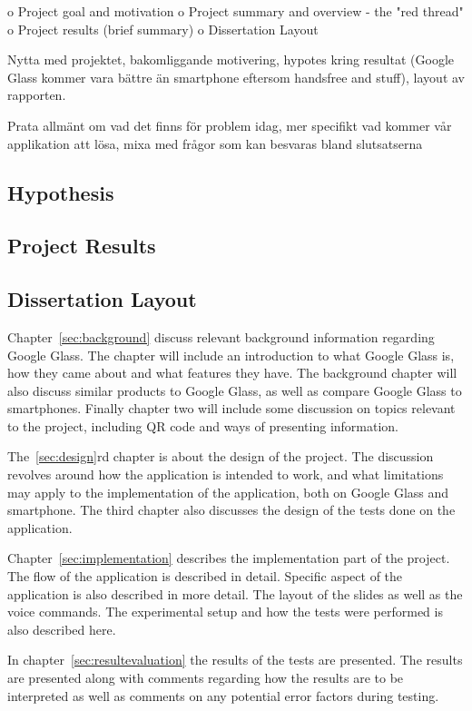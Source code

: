 o   Project goal and motivation
o   Project summary and overview - the "red thread"
o   Project results (brief summary)
o   Dissertation Layout

Nytta med projektet, bakomliggande motivering, hypotes kring resultat (Google Glass kommer vara bättre än smartphone eftersom handsfree and stuff), layout av rapporten.

Prata allmänt om vad det finns för problem idag, mer specifikt vad kommer vår applikation att lösa, mixa med frågor som kan besvaras bland slutsatserna

\subsection{Hypothesis}


\subsection{Project Results}


\subsection{Dissertation Layout}
Chapter~\ref{sec:background} discuss relevant background information regarding Google Glass. The chapter will include an introduction to what Google Glass is, how they came about and what features they have. The background chapter will also discuss similar products to Google Glass, as well as compare Google Glass to smartphones. Finally chapter two will include some discussion on topics relevant to the project, including QR code and ways of presenting information.

The~\ref{sec:design}rd chapter is about the design of the project. The discussion revolves around how the application is intended to work, and what limitations may apply to the implementation of the application, both on Google Glass and smartphone. The third chapter also discusses the design of the tests done on the application.

Chapter~\ref{sec:implementation} describes the implementation part of the project. The flow of the application is described in detail. Specific aspect of the application is also described in more detail. The layout of the slides as well as the voice commands. The experimental setup and how the tests were performed is also described here.

In chapter~\ref{sec:resultevaluation} the results of the tests are presented. The results are presented along with comments regarding how the results are to be interpreted as well as comments on any potential error factors during testing.

